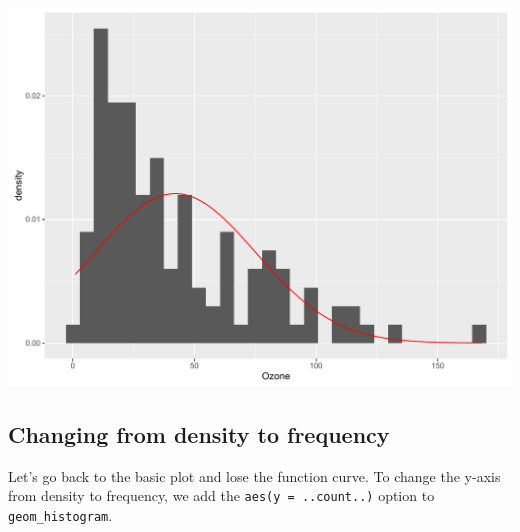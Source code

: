 \documentclass[]{article}
\newenvironment{Shaded}{\begin{snugshade}}{\end{snugshade}}
\newcommand{\KeywordTok}[1]{\textcolor[rgb]{0.13,0.29,0.53}{\textbf{{#1}}}}
\newcommand{\DataTypeTok}[1]{\textcolor[rgb]{0.13,0.29,0.53}{{#1}}}
\newcommand{\StringTok}[1]{\textcolor[rgb]{0.31,0.60,0.02}{{#1}}}
\newcommand{\OtherTok}[1]{\textcolor[rgb]{0.56,0.35,0.01}{{#1}}}
\newcommand{\NormalTok}[1]{{#1}}
\begin{document}
\begin{Shaded}
\end{Shaded}

\begin{center}\includegraphics{0_all_posts_pdf/histogram_2-1} \end{center}

\subsection{Changing from density to
frequency}\label{changing-from-density-to-frequency}

Let's go back to the basic plot and lose the function curve. To change
the y-axis from density to frequency, we add the
\texttt{aes(y\ =\ ..count..)} option to \texttt{geom\_histogram}.
\end{document}
